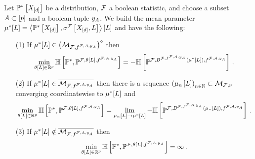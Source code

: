 \begin{lemma}
    \label{lem:minCrossEntropyExponential}
    Let $\mathbb{P}^*\left[X_{[d]}\right]$ be a distribution, $\mathcal{F}$ a boolean statistic, and choose a subset $A\subset[p]$ and a boolean tuple $y_{A}$.
    We build the mean parameter $\mu^*[L]=\left\langle \mathbb{P}^*\left[X_{[d]}\right],\sigma^{\mathcal{F}}\left[X_{[d]},L\right]\right\rangle \left[ L \right]$ and have the following:
    \begin{itemize}
        \item[(1)] If $\mu^*[L] \in {\left(\mathcal{M}_{\mathcal{F},f^{\mathcal{F},A,y_{A}}}\right)}^{\circ}$ then
            \begin{align*}
                \min_{\theta\left[L\right]\in\mathbb{R}^{p}} \mathbb{H}\left[\mathbb{P}^*,\mathbb{P}^{\mathcal{F},\theta\left[L\right],f^{\mathcal{F},A,y_{A}}}\right]
                = -\mathbb{H}\left[\mathbb{P}^{\mathcal{F},B^{\mathcal{F},f^{\mathcal{F},A,y_{A}}}(\mu^*[L]),f^{\mathcal{F},A,y_{A}}}\right] \, .
            \end{align*}
        \item[(2)] If $\mu^*[L]\in\overline{\mathcal{M}_{\mathcal{F},f^{\mathcal{F},A,y_{A}}}}$ then there is a sequence $\left(\mu_{n}\left[L\right]\right)_{n\in\mathbb{N}}\subset\mathcal{M}_{\mathcal{F},\nu}$ converging coordinatewise to $\mu^*[L]$ and
            \begin{align*}
                \min_{\theta\left[L\right]\in\mathbb{R}^{p}} \mathbb{H}\left[\mathbb{P}^*,\mathbb{P}^{\mathcal{F},\theta\left[L\right],f^{\mathcal{F},A,y_{A}}}\right]
                = \lim_{\mu_{n}\left[L\right]\rightarrow\mu^*[L]}-\mathbb{H}\left[\mathbb{P}^{\mathcal{F},B^{\mathcal{F},f^{\mathcal{F},A,y_{A}}}(\mu_{n}\left[L\right]),f^{\mathcal{F},A,y_{A}}}\right] \, .
            \end{align*}
        \item[(3)] If $\mu^*[L]\notin\overline{\mathcal{M}_{\mathcal{F},f^{\mathcal{F},A,y_{A}}}}$ then
            \begin{align*}
                \min_{\theta\left[L\right]\in\mathbb{R}^{p}} \mathbb{H}\left[\mathbb{P}^*,\mathbb{P}^{\mathcal{F},\theta\left[L\right],f^{\mathcal{F},A,y_{A}}}\right]
                = \infty \, .
            \end{align*}
    \end{itemize}

\end{lemma}
